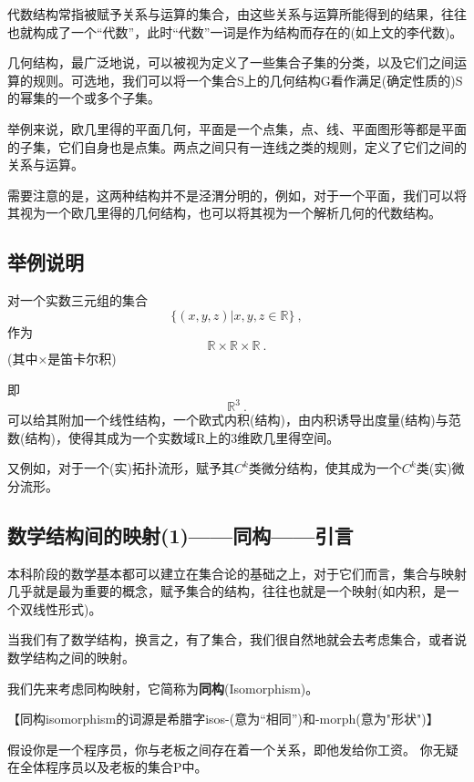 代数结构常指被赋予关系与运算的集合，由这些关系与运算所能得到的结果，往往也就构成了一个“代数”，此时“代数”一词是作为结构而存在的(如上文的李代数)。

几何结构，最广泛地说，可以被视为定义了一些集合子集的分类，以及它们之间运算的规则。可选地，我们可以将一个集合S上的几何结构G看作满足(确定性质的)S的幂集的一个或多个子集。 

举例来说，欧几里得的平面几何，平面是一个点集，点、线、平面图形等都是平面的子集，它们自身也是点集。两点之间只有一连线之类的规则，定义了它们之间的关系与运算。

需要注意的是，这两种结构并不是泾渭分明的，例如，对于一个平面，我们可以将其视为一个欧几里得的几何结构，也可以将其视为一个解析几何的代数结构。

\subsection{举例说明}
对一个实数三元组的集合
\begin{equation}
\{(x,y,z)|x,y,z \in {\mathbb R} \}~,
\end{equation}
作为
\begin{equation}
{\mathbb R} \times {\mathbb R} \times {\mathbb R}~.
\end{equation}
(其中×是笛卡尔积)

即\begin{equation}
{\mathbb R}^3~.
\end{equation}
可以给其附加一个线性结构，一个欧式内积(结构)，由内积诱导出度量(结构)与范数(结构)，使得其成为一个实数域R上的3维欧几里得空间。 

又例如，对于一个(实)拓扑流形，赋予其$C^k$类微分结构，使其成为一个$C^k$类(实)微分流形。

\subsection{数学结构间的映射(1)——同构——引言}
本科阶段的数学基本都可以建立在集合论的基础之上，对于它们而言，集合与映射几乎就是最为重要的概念，赋予集合的结构，往往也就是一个映射(如内积，是一个双线性形式)。

当我们有了数学结构，换言之，有了集合，我们很自然地就会去考虑集合，或者说数学结构之间的映射。

我们先来考虑同构映射，它简称为\textbf{同构}(Isomorphism)。

【同构isomorphism的词源是希腊字isos-(意为“相同”)和-morph(意为"形状")】

假设你是一个程序员，你与老板之间存在着一个关系，即他发给你工资。
你无疑在全体程序员以及老板的集合P中。

